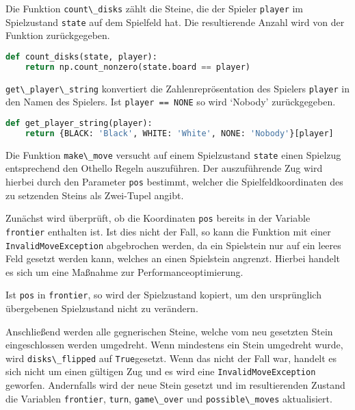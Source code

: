 Die Funktion \passthrough{\lstinline!count\_disks!} zählt die Steine,
die der Spieler \passthrough{\lstinline!player!} im Spielzustand
\passthrough{\lstinline!state!} auf dem Spielfeld hat. Die resultierende
Anzahl wird von der Funktion zurückgegeben.

\begin{lstlisting}[language=Python]
def count_disks(state, player):
    return np.count_nonzero(state.board == player)
\end{lstlisting}

\passthrough{\lstinline!get\_player\_string!} konvertiert die
Zahlenreprösentation des Spielers \passthrough{\lstinline!player!} in
den Namen des Spielers. Ist \passthrough{\lstinline!player == NONE!} so
wird `Nobody' zurückgegeben.

\begin{lstlisting}[language=Python]
def get_player_string(player):
    return {BLACK: 'Black', WHITE: 'White', NONE: 'Nobody'}[player]
\end{lstlisting}

Die Funktion \passthrough{\lstinline!make\_move!} versucht auf einem
Spielzustand \passthrough{\lstinline!state!} einen Spielzug entsprechend
den Othello Regeln auszuführen. Der auszuführende Zug wird hierbei durch
den Parameter \passthrough{\lstinline!pos!} bestimmt, welcher die
Spielfeldkoordinaten des zu setzenden Steins als Zwei-Tupel angibt.

Zunächst wird überprüft, ob die Koordinaten
\passthrough{\lstinline!pos!} bereits in der Variable
\passthrough{\lstinline!frontier!} enthalten ist. Ist dies nicht der
Fall, so kann die Funktion mit einer
\passthrough{\lstinline!InvalidMoveException!} abgebrochen werden, da
ein Spielstein nur auf ein leeres Feld gesetzt werden kann, welches an
einen Spielstein angrenzt. Hierbei handelt es sich um eine Maßnahme zur
Performanceoptimierung.

Ist \passthrough{\lstinline!pos!} in \passthrough{\lstinline!frontier!},
so wird der Spielzustand kopiert, um den ursprünglich übergebenen
Spielzustand nicht zu verändern.

Anschließend werden alle gegnerischen Steine, welche vom neu gesetzten
Stein eingeschlossen werden umgedreht. Wenn mindestens ein Stein
umgedreht wurde, wird \passthrough{\lstinline!disks\_flipped!} auf
\passthrough{\lstinline!True!}gesetzt. Wenn das nicht der Fall war,
handelt es sich nicht um einen gültigen Zug und es wird eine
\passthrough{\lstinline!InvalidMoveException!} geworfen. Andernfalls
wird der neue Stein gesetzt und im resultierenden Zustand die Variablen
\passthrough{\lstinline!frontier!}, \passthrough{\lstinline!turn!},
\passthrough{\lstinline!game\_over!} und
\passthrough{\lstinline!possible\_moves!} aktualisiert.


